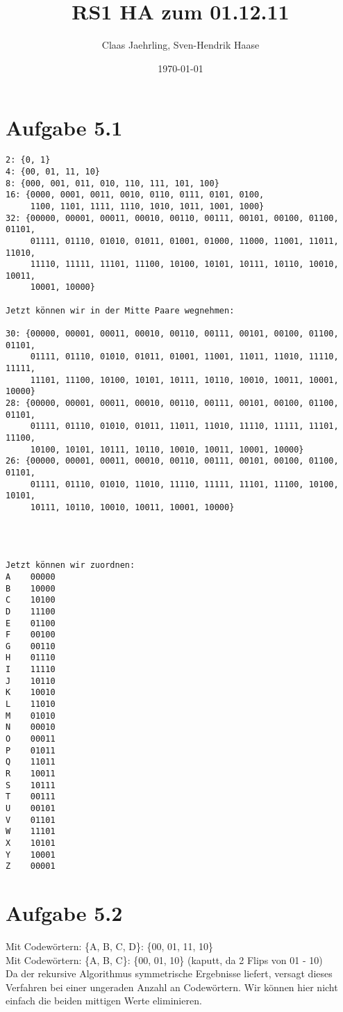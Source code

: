 \documentclass[12pt]{article}
\author{Claas Jaehrling, Sven-Hendrik Haase}
\title{RS1 HA zum 01.12.11}
\date{\today}
\begin{document}
\setcounter{secnumdepth}{0}
\maketitle

\section{Aufgabe 5.1}

\begin{verbatim}
2: {0, 1}
4: {00, 01, 11, 10}
8: {000, 001, 011, 010, 110, 111, 101, 100}
16: {0000, 0001, 0011, 0010, 0110, 0111, 0101, 0100,
     1100, 1101, 1111, 1110, 1010, 1011, 1001, 1000}
32: {00000, 00001, 00011, 00010, 00110, 00111, 00101, 00100, 01100, 01101,
     01111, 01110, 01010, 01011, 01001, 01000, 11000, 11001, 11011, 11010,
     11110, 11111, 11101, 11100, 10100, 10101, 10111, 10110, 10010, 10011,
     10001, 10000}

Jetzt können wir in der Mitte Paare wegnehmen:

30: {00000, 00001, 00011, 00010, 00110, 00111, 00101, 00100, 01100, 01101, 
     01111, 01110, 01010, 01011, 01001, 11001, 11011, 11010, 11110, 11111, 
     11101, 11100, 10100, 10101, 10111, 10110, 10010, 10011, 10001, 10000}
28: {00000, 00001, 00011, 00010, 00110, 00111, 00101, 00100, 01100, 01101,
     01111, 01110, 01010, 01011, 11011, 11010, 11110, 11111, 11101, 11100,
     10100, 10101, 10111, 10110, 10010, 10011, 10001, 10000}
26: {00000, 00001, 00011, 00010, 00110, 00111, 00101, 00100, 01100, 01101,
     01111, 01110, 01010, 11010, 11110, 11111, 11101, 11100, 10100, 10101,
     10111, 10110, 10010, 10011, 10001, 10000}




Jetzt können wir zuordnen:
A    00000
B    10000
C    10100
D    11100
E    01100
F    00100
G    00110
H    01110
I    11110
J    10110
K    10010
L    11010
M    01010
N    00010
O    00011
P    01011
Q    11011
R    10011
S    10111
T    00111
U    00101
V    01101
W    11101
X    10101
Y    10001
Z    00001
\end{verbatim}
 

\section{Aufgabe 5.2}
Mit Codewörtern: \{A, B, C, D\}: \{00, 01, 11, 10\} \\
Mit Codewörtern: \{A, B, C\}: \{00, 01, 10\} (kaputt, da 2 Flips von 01 - 10) \\
Da der rekursive Algorithmus symmetrische Ergebnisse liefert, versagt dieses Verfahren bei einer ungeraden Anzahl an Codewörtern. Wir können hier nicht einfach die beiden mittigen Werte eliminieren.
\end{document}

